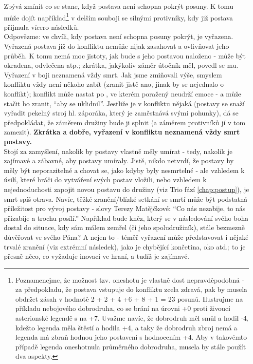 Zbývá zmínit co se stane, když postava není schopna pokrýt posuny. K tomu může dojít například\footnote{Poznamenejme, že možnost tzv. oneshotu je vlastně dost nepravděpodobná - za předpokladu, že postava vstupuje do konfliktu zcela zdravá, pak by musela obdržet zásah v hodnotě 2 + 2 + 4 +6 + 8 + 1 = 23 posunů. Ilustrujme na příkladu nebojového dobrodruha, co se brání  na úrovni +0 proti živoucí asterionské legendě s  na +7. Uvažme navíc, že dobrodruh měl smůl a hodil -4, kdežto legenda měla štěstí a hodila +4, a taky že dobrodruh zbroj nemá a legenda má zbraň hodnou jeho postavení s hodnocením +4. Aby v takovémto případě legenda oneshotnula průměrného dobrodruha, musela by stále použít dva aspekty. } v delším souboji se silnými protivníky, kdy již postava přijmula vícero následků.\\ 
Odpovězme: ve chvíli, kdy postava není schopna posuny pokrýt, je vyřazena. Vyřazená postava již do konfliktu nemůže nijak zasahovat a ovlivňovat jeho průběh. K tomu nemá moc jistoty, jak bude s jeho postavou naloženo - může být okradena, odvlečena atp.; zkrátka, jakýkoliv záměr útočník měl, povedl se mu. \\
Vyřazení v boji neznamená vždy smrt. Jak jsme zmiňovali výše, smyslem konfliktu vždy není někoho zabít (zranit jistě ano, jinak by se nejednalo o konflikt); konflikt může nastat po , ve kterém poražený neudrží emoce - a může stačit ho zranit, ``aby se uklidnil''. Jestliže je v konfliktu nějaká  (postavy se snaží vyřadit pekelný stroj hl. záporáka, který je zaměstnává svými pohunky), dá se předpokládat, že záměrem družiny bude ji splnit (a záměrem protivníků jí v tom zamezit). \textbf{Zkrátka a dobře, vyřazení v konfliktu neznamená vždy smrt postavy.}\\
Stojí za zamyšlení, nakolik by postavy vlastně měly umírat - tedy, nakolik je zajímavé a zábavné, aby postavy umíraly. Jistě, nikdo netvrdí, že postavy by měly být neporazitelné a chovat se, jako kdyby byly nesmrtelné - ale vzhledem k úsilí, které hráči do vytváření svých postav vložili, nebo vzhledem k nejednoduchosti zapojit novou postavu do družiny (viz Trio fází \ref{chap:postup}), je smrt spíš otrava. Navíc, těžké zranění/blízké setkání se smrtí může být podstatná příležitost pro vývoj postavy - slovy Terezy Matějčkové: ``Co nás nezabije, to nás přizabije a trochu posílí.'' Například bude kněz, který se v následování svého boha dostal do situace, kdy sám málem zemřel (či jeho spoludružiník), stále bezmezně důvěřovat ve svého Pána? A nejen to - téměř vyřazení může představovat i nějaké trvalé zranění (viz extrémní následek), jako je chybějící končetina, oko atd.; to je přesně něco, co vyžaduje inovaci ve hraní, a tudíž je zajímavé.

